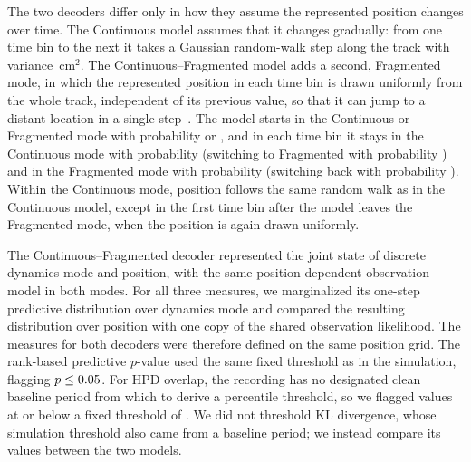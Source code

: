 \documentclass[12pt]{article}
\begin{document}
The two decoders differ only in how they assume the represented position changes over time. The Continuous model assumes that it changes gradually: from one time bin to the next it takes a Gaussian random-walk step along the track with variance \RecMovementVar\,cm$^2$. The Continuous--Fragmented model adds a second, Fragmented mode, in which the represented position in each time bin is drawn uniformly from the whole track, independent of its previous value, so that it can jump to a distant location in a single step~\cite{DenovellisHippocampalreplayexperience2021}. The model starts in the Continuous or Fragmented mode with probability \RecModeContinuousInitial{} or \RecModeFragmentedInitial{}, and in each time bin it stays in the Continuous mode with probability \RecModeContinuousStay{} (switching to Fragmented with probability \RecModeContinuousToFragmented{}) and in the Fragmented mode with probability \RecModeFragmentedStay{} (switching back with probability \RecModeFragmentedToContinuous{}). Within the Continuous mode, position follows the same random walk as in the Continuous model, except in the first time bin after the model leaves the Fragmented mode, when the position is again drawn uniformly.

The Continuous--Fragmented decoder represented the joint state of discrete dynamics mode and position, with the same position-dependent observation model in both modes. For all three measures, we marginalized its one-step predictive distribution over dynamics mode and compared the resulting distribution over position with one copy of the shared observation likelihood. The measures for both decoders were therefore defined on the same position grid. The rank-based predictive $p$-value used the same fixed threshold as in the simulation, flagging $p \leq 0.05$. For HPD overlap, the recording has no designated clean baseline period from which to derive a percentile threshold, so we flagged values at or below a fixed threshold of \RecHpdCutoff{}. We did not threshold KL divergence, whose simulation threshold also came from a baseline period; we instead compare its values between the two models.
\end{document}
